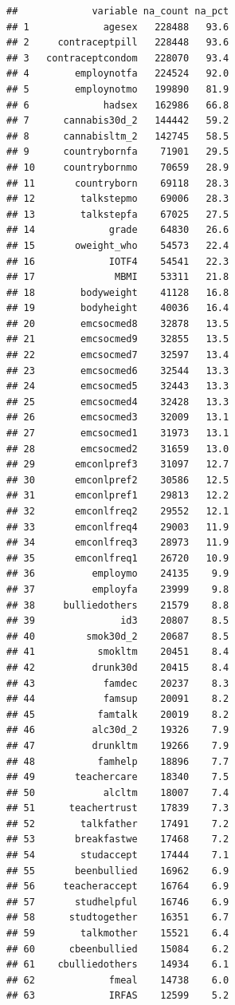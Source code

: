 \documentclass[
]{article}
\begin{document}
\begin{verbatim}
##             variable na_count na_pct
## 1             agesex   228488   93.6
## 2     contraceptpill   228448   93.6
## 3   contraceptcondom   228070   93.4
## 4        employnotfa   224524   92.0
## 5        employnotmo   199890   81.9
## 6             hadsex   162986   66.8
## 7      cannabis30d_2   144442   59.2
## 8      cannabisltm_2   142745   58.5
## 9      countrybornfa    71901   29.5
## 10     countrybornmo    70659   28.9
## 11       countryborn    69118   28.3
## 12        talkstepmo    69006   28.3
## 13        talkstepfa    67025   27.5
## 14             grade    64830   26.6
## 15       oweight_who    54573   22.4
## 16             IOTF4    54541   22.3
## 17              MBMI    53311   21.8
## 18        bodyweight    41128   16.8
## 19        bodyheight    40036   16.4
## 20        emcsocmed8    32878   13.5
## 21        emcsocmed9    32855   13.5
## 22        emcsocmed7    32597   13.4
## 23        emcsocmed6    32544   13.3
## 24        emcsocmed5    32443   13.3
## 25        emcsocmed4    32428   13.3
## 26        emcsocmed3    32009   13.1
## 27        emcsocmed1    31973   13.1
## 28        emcsocmed2    31659   13.0
## 29       emconlpref3    31097   12.7
## 30       emconlpref2    30586   12.5
## 31       emconlpref1    29813   12.2
## 32       emconlfreq2    29552   12.1
## 33       emconlfreq4    29003   11.9
## 34       emconlfreq3    28973   11.9
## 35       emconlfreq1    26720   10.9
## 36          employmo    24135    9.9
## 37          employfa    23999    9.8
## 38     bulliedothers    21579    8.8
## 39               id3    20807    8.5
## 40         smok30d_2    20687    8.5
## 41           smokltm    20451    8.4
## 42          drunk30d    20415    8.4
## 43            famdec    20237    8.3
## 44            famsup    20091    8.2
## 45           famtalk    20019    8.2
## 46          alc30d_2    19326    7.9
## 47          drunkltm    19266    7.9
## 48           famhelp    18896    7.7
## 49       teachercare    18340    7.5
## 50            alcltm    18007    7.4
## 51      teachertrust    17839    7.3
## 52        talkfather    17491    7.2
## 53       breakfastwe    17468    7.2
## 54        studaccept    17444    7.1
## 55       beenbullied    16962    6.9
## 56     teacheraccept    16764    6.9
## 57       studhelpful    16746    6.9
## 58      studtogether    16351    6.7
## 59        talkmother    15521    6.4
## 60      cbeenbullied    15084    6.2
## 61    cbulliedothers    14934    6.1
## 62             fmeal    14738    6.0
## 63             IRFAS    12599    5.2

\end{verbatim}
\end{document}
